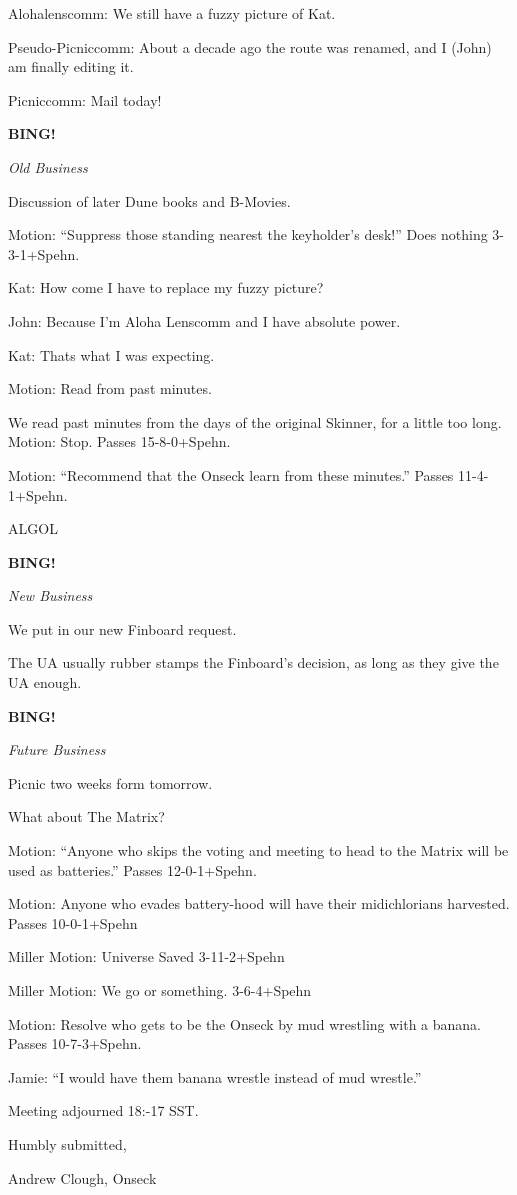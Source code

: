 \documentclass[12pt]{article}
\newcommand{\bing}{{\bf BING!} }
\newcommand{\goto}[1]{\bing \vskip 12pt \centerline{{\em{#1}}}}
\begin{document}
Alohalenscomm:  We still have a fuzzy picture of Kat.

Pseudo-Picniccomm: About a decade ago the route was renamed, and I
(John) am finally editing it.

Picniccomm:  Mail today!

\goto{Old Business}

Discussion of later Dune books and B-Movies.

Motion: ``Suppress those standing nearest the keyholder's desk!''
Does nothing 3-3-1+Spehn.

Kat:  How come I have to replace my fuzzy picture?

John:  Because I'm Aloha Lenscomm and I have absolute power.

Kat:  Thats what I was expecting.

Motion:  Read from past minutes.

We read past minutes from the days of the original Skinner, for a
little too long.  Motion: Stop. Passes 15-8-0+Spehn.

Motion: ``Recommend that the Onseck learn from these minutes.''
Passes 11-4-1+Spehn.

ALGOL

\goto{New Business}

We put in our new Finboard request.

The UA usually rubber stamps the Finboard's decision, as long as they
give the UA enough.

\goto{Future Business}

Picnic two weeks form tomorrow.

What about The Matrix?

Motion: ``Anyone who skips the voting and meeting to head to the
Matrix will be used as batteries.''  Passes 12-0-1+Spehn.

Motion: Anyone who evades battery-hood will have their midichlorians
harvested.  Passes 10-0-1+Spehn

Miller Motion:  Universe Saved 3-11-2+Spehn

Miller Motion:  We go or something.  3-6-4+Spehn

Motion: Resolve who gets to be the Onseck by mud wrestling with a
banana.  Passes 10-7-3+Spehn.

Jamie:  ``I would have them banana wrestle instead of mud wrestle.''


\vspace{12pt}

\noindent
Meeting adjourned 18:-17 SST.

\vspace{18pt}

\centerline{Humbly submitted,}
\centerline{Andrew Clough, Onseck}
\end{document}
